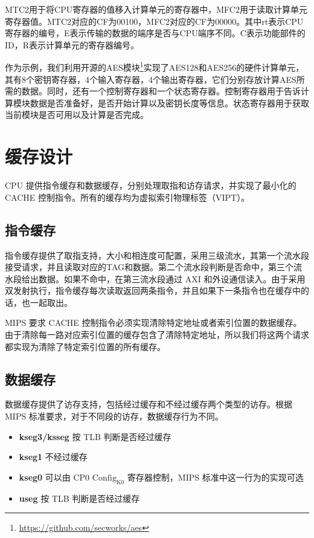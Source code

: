 MTC2用于将CPU寄存器的值移入计算单元的寄存器中，MFC2用于读取计算单元寄存器值。MTC2对应的CF为00100，MFC2对应的CF为00000。其中rt表示CPU寄存器的编号，E表示传输的数据的端序是否与CPU端序不同。C表示功能部件的ID，R表示计算单元的寄存器编号。

作为示例，我们利用开源的AES模块\footnote{\url{https://github.com/secworks/aes}}实现了AES128和AES256的硬件计算单元，其有8个密钥寄存器，4个输入寄存器，4个输出寄存器，它们分别存放计算AES所需的数据。同时，还有一个控制寄存器和一个状态寄存器。控制寄存器用于告诉计算模块数据是否准备好，是否开始计算以及密钥长度等信息。状态寄存器用于获取当前模块是否可用以及计算是否完成。

\section{缓存设计}
CPU 提供指令缓存和数据缓存，分别处理取指和访存请求，并实现了最小化的 CACHE 控制指令。所有的缓存均为虚拟索引物理标签（VIPT）。
\subsection{指令缓存}
指令缓存提供了取指支持，大小和相连度可配置，采用三级流水，其第一个流水段接受请求，并且读取对应的TAG和数据。第二个流水段判断是否命中，第三个流水段给出数据。如果不命中，在第三流水段通过 AXI 和外设通信读入。由于采用双发射执行，指令缓存每次读取返回两条指令，并且如果下一条指令也在缓存中的话，也一起取出。

MIPS 要求 CACHE 控制指令必须实现清除特定地址或者索引位置的数据缓存。由于清除每一路对应索引位置的缓存包含了清除特定地址，所以我们将这两个请求都实现为清除了特定索引位置的所有缓存。

\subsection{数据缓存}
数据缓存提供了访存支持，包括经过缓存和不经过缓存两个类型的访存。根据 MIPS 标准要求，对于不同段的访存，数据缓存行为不同。

\begin{itemize}
	\item \textbf{kseg3/ksseg} 按 TLB 判断是否经过缓存
	\item \textbf{kseg1} 不经过缓存
	\item \textbf{kseg0} 可以由 CP0 $\mathrm{Config_{K0}}$ 寄存器控制，MIPS 标准中这一行为的实现可选
    \item \textbf{useg} 按 TLB 判断是否经过缓存
\end{itemize}

